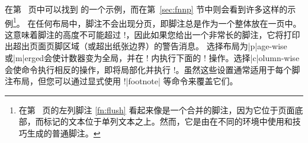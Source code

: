 在第~\pageref{sec:ref-paracol} 页中可以找到 \Mgfnote{} 的一个示例，而在第~\ref{sec:fnnp} 节中则会看到许多这样的示例\footnote{在第~\pageref{fn:flush} 页的左列脚注 \ref{fn:flush} 看起来像是一个合并的脚注，因为它位于页面底部，而标记的文本位于单列文本之上。然而，它是由在不同的环境中使用和技巧生成的普通\mcfnote{}脚注。}。
% 
% 
在任何布局中，脚注不会出现分页，即脚注总是作为一个整体放在一页中。这意味着脚注的高度不可能超过 \!\textheight!，因此如果您给出一个非常长的脚注，它将打印出超出页面页脚区域（或超出纸张边界）的警告消息。
% 
选择布局为|p|age-wise或|m|erged会使计数器变为全局，并在 \!\footnotelayout! 内执行下面的 \!\fncounteradjustment! 操作。选择|c|olumn-wise会使命令执行相反的操作，即将局部化并执行 \!\nofncounteradjustment!。虽然这些设置通常适用于每个脚注布局，但您可以通过显式使用 \!\localcounter!|{footnote}| 等命令来覆盖它们。
% 
